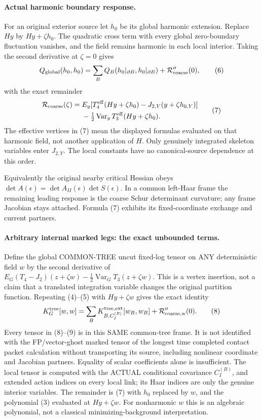 \documentclass[11pt]{article}
\begin{document}
\paragraph{Actual harmonic boundary response.}
For an original exterior source let $h_0$ be its global harmonic
extension. Replace $Hy$ by $Hy+\zeta h_0$. The quadratic cross term
with every global zero-boundary fluctuation vanishes, and the field
remains harmonic in each local interior. Taking the second derivative
at $\zeta=0$ gives
\[
 Q_{\rm global}(h_0,h_0)=\sum_B Q_B(h_0|_{\partial B},h_0|_{\partial B})
                              +{\cal R}_{\rm coarse}''(0), \tag{6}
\]
with the exact remainder
\[
 \begin{split}
 {\cal R}_{\rm coarse}(\zeta)={}&E_y[
 T_4^{\rm eff}(Hy+\zeta h_0)-J_{2,Y}(y+\zeta h_{0,Y})]\\
 &-\tfrac12\operatorname{Var}_y T_3^{\rm eff}(Hy+\zeta h_0).
 \end{split} \tag{7}
\]
The effective vertices in (7) mean the displayed formulas evaluated
on that harmonic field, not another application of $H$. Only genuinely
integrated skeleton variables enter $J_{2,Y}$. The local constants
have no canonical-source dependence at this order.

Equivalently the original nearby critical Hessian obeys
$\det A(\epsilon)=\det A_{II}(\epsilon)\det S(\epsilon)$.
In a common left-Haar frame the remaining leading response is the
coarse Schur determinant curvature; any frame Jacobian stays attached.
Formula (7) exhibits its fixed-coordinate exchange and current partners.

\paragraph{Arbitrary internal marked legs: the exact unbounded terms.}
Define the global COMMON-TREE uncut fixed-log tensor on ANY deterministic field $w$
by the second derivative of
$E_G(T_4-J_2)(z+\zeta w)-\frac12\operatorname{Var}_G T_3(z+\zeta w)$.
This is a vertex insertion, not a claim that a translated integration
variable changes the original partition function. Repeating (4)--(5)
with $Hy+\zeta w$ gives the exact identity
\[
 K_G^{\rm tree}[w,w]=\sum_B K_{B,C_I^{(B)}}^{\rm tree,ext}[w_B,w_B]
                         +{\cal R}_{\rm coarse,w}''(0). \tag{8}
\]
Every tensor in (8)--(9) is in this SAME common-tree frame. It is not
identified with the FP/vector-ghost marked tensor of the longest time completed contact packet calculation without
transporting its source, including nonlinear coordinate and Jacobian
partners. Equality of scalar coefficients alone is insufficient.
The local tensor is computed with the ACTUAL conditional covariance
$C_I^{(B)}$, and extended action indices on every local link; its Haar
indices are only the genuine interior variables. The remainder is
(7) with $h_0$ replaced by $w$, and the polynomial (3) evaluated at
$Hy+\zeta w$. For nonharmonic $w$ this is an algebraic polynomial,
not a classical minimizing-background interpretation.
\end{document}
